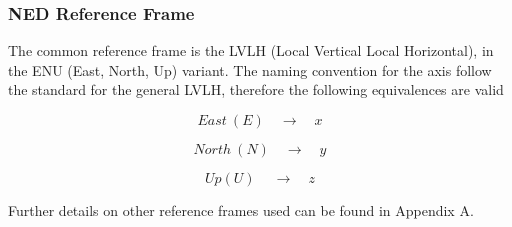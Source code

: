 \newpage
\subsubsection{NED Reference Frame}

   The common reference frame is the LVLH (Local Vertical Local Horizontal), in the ENU (East, North, Up) variant.
   The naming convention for the axis follow the standard for the general LVLH, therefore the following equivalences are valid

   $$
      East\: (E) \quad\to\quad x
   $$

   $$
      North\: (N) \quad\to\quad y
   $$

   $$
      Up (U)\: \quad\to\quad z
   $$

Further details on other reference frames used can be found in Appendix A.